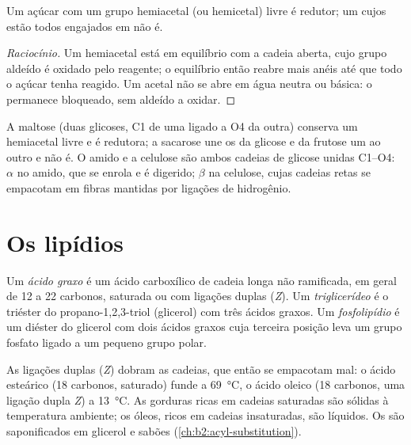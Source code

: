 \begin{proposition}\label{prop:b2:biomolecules:reducing}
Um açúcar com um grupo hemiacetal (ou hemicetal) livre é redutor; um  cujos  estão todos engajados em  não é.
\end{proposition}

\begin{proof}[Raciocínio]
Um hemiacetal está em equilíbrio com a cadeia aberta, cujo grupo aldeído é oxidado pelo reagente; o
equilíbrio então reabre mais anéis até que todo o açúcar tenha reagido. Um acetal não se abre em água
neutra ou básica: o  permanece bloqueado, sem aldeído a oxidar.
\end{proof}

A maltose (duas glicoses, C1 de uma ligado a O4 da outra) conserva um hemiacetal livre e é redutora; a
sacarose une os  da glicose e da frutose um ao outro e não é. O amido e a celulose
são ambos cadeias de glicose unidas C1--O4: $\alpha$ no amido, que se enrola e é digerido; $\beta$ na
celulose, cujas cadeias retas se empacotam em fibras mantidas por ligações de hidrogênio.

\section{Os lipídios}

\begin{definition}[Lipídios]\label{def:b2:biomolecules:lipid}
Um \emph{ácido graxo} é um ácido carboxílico de cadeia longa não ramificada, em geral de 12
a 22 carbonos, saturada ou com ligações duplas (\textit{Z}). Um \emph{triglicerídeo} é o
triéster do propano-1,2,3-triol (glicerol) com três ácidos graxos. Um
\emph{fosfolipídio} é um diéster do glicerol com dois ácidos graxos cuja terceira
posição leva um grupo fosfato ligado a um pequeno grupo polar.
\end{definition}

As ligações duplas (\textit{Z}) dobram as cadeias, que então se empacotam mal: o ácido esteárico (18
carbonos, saturado) funde a \qty{69}{\degreeCelsius}, o ácido oleico (18 carbonos, uma ligação dupla
\textit{Z}) a \qty{13}{\degreeCelsius}. As gorduras ricas em cadeias saturadas são sólidas à temperatura
ambiente; os óleos, ricos em cadeias insaturadas, são líquidos. Os  são saponificados em
glicerol e sabões (\cref{ch:b2:acyl-substitution}).

